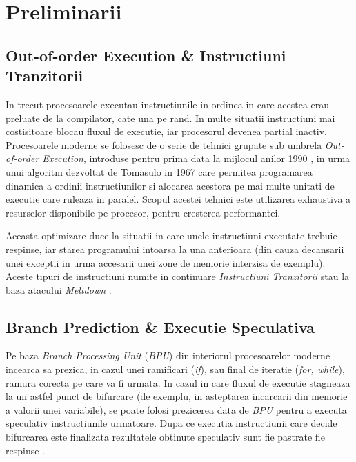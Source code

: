 \chapter{Preliminarii}

\section{Out-of-order Execution \& Instructiuni Tranzitorii}

In trecut procesoarele executau instructiunile in ordinea in care acestea erau
preluate de la compilator, cate una pe rand. In multe situatii instructiuni mai
costisitoare blocau fluxul de executie, iar procesorul devenea partial inactiv.
Procesoarele moderne se folosesc de o serie de tehnici grupate sub umbrela
\emph{Out-of-order Execution}, introduse pentru prima data la mijlocul anilor
1990 \cite{what_is_speculative_execution}, in urma unui algoritm dezvoltat de 
Tomasulo in 1967 \cite{tomasulo1967} care permitea programarea dinamica
a ordinii instructiunilor si alocarea acestora pe mai multe unitati de executie
care ruleaza in paralel. Scopul acestei tehnici este utilizarea exhaustiva a
resurselor disponibile pe procesor, pentru cresterea performantei. 

Aceasta optimizare duce la situatii in care unele instructiuni executate trebuie 
respinse, iar starea programului intoarsa la una anterioara (din cauza decansarii 
unei exceptii in urma accesarii unei zone de memorie interzisa de exemplu). Aceste 
tipuri de instructiuni numite in continuare \emph{Instructiuni Tranzitorii} stau la 
baza atacului \emph{Meltdown} \cite{meltdown2018}.


\section{Branch Prediction \& Executie Speculativa}

Pe baza \emph{Branch Processing Unit} (\emph{BPU}) din interiorul procesoarelor
moderne incearca sa prezica, in cazul unei ramificari (\emph{if}), sau final de
iteratie (\emph{for, while}), ramura corecta pe care va fi urmata. In cazul in
care fluxul de executie stagneaza la un astfel punct de bifurcare (de exemplu,
in asteptarea incarcarii din memorie a valorii unei variabile), se poate folosi
prezicerea data de \emph{BPU} pentru a executa speculativ instructiunile
urmatoare. Dupa ce executia instructiunii care decide bifurcarea este finalizata
rezultatele obtinute speculativ sunt fie pastrate fie respinse \cite{spectre2019}.

